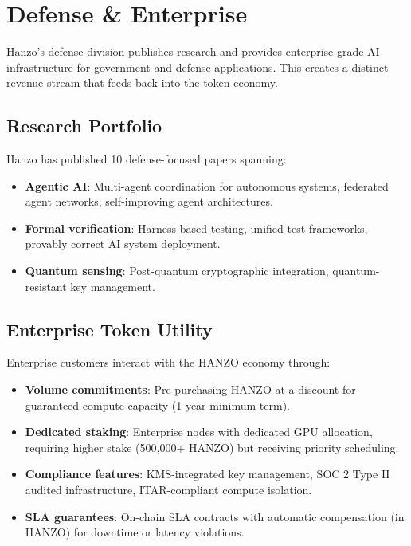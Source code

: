 \section{Defense \& Enterprise}

\label{sec:defense}

Hanzo's defense division publishes research and provides enterprise-grade AI
infrastructure for government and defense applications. This creates a distinct
revenue stream that feeds back into the token economy.

\subsection{Research Portfolio}

Hanzo has published 10 defense-focused papers spanning:

\begin{itemize}[leftmargin=1.1em]
    \item \textbf{Agentic AI}: Multi-agent coordination for autonomous systems,
    federated agent networks, self-improving agent architectures.
    \item \textbf{Formal verification}: Harness-based testing, unified test
    frameworks, provably correct AI system deployment.
    \item \textbf{Quantum sensing}: Post-quantum cryptographic integration,
    quantum-resistant key management.
\end{itemize}

\subsection{Enterprise Token Utility}

Enterprise customers interact with the HANZO economy through:

\begin{itemize}[leftmargin=1.1em]
    \item \textbf{Volume commitments}: Pre-purchasing HANZO at a discount for
    guaranteed compute capacity (1-year minimum term).
    \item \textbf{Dedicated staking}: Enterprise nodes with dedicated GPU
    allocation, requiring higher stake (500,000+ HANZO) but receiving
    priority scheduling.
    \item \textbf{Compliance features}: KMS-integrated key management, SOC 2 Type
    II audited infrastructure, ITAR-compliant compute isolation.
    \item \textbf{SLA guarantees}: On-chain SLA contracts with automatic
    compensation (in HANZO) for downtime or latency violations.
\end{itemize}


